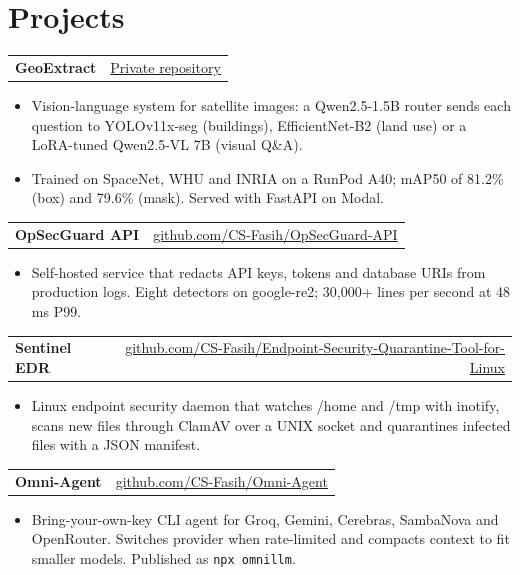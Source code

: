 \documentclass[a4paper,10pt]{article}
\makeatletter
\newcommand{\project}[4]{%
  \begin{tabularx}{\linewidth}{@{}X r@{}}
    \textbf{#1} \;{\color{muted}\small #2} & \small\href{#4}{#3} \\
  \end{tabularx}\vspace{-1pt}}
\makeatother
\begin{document}
\section{Projects}
\project{GeoExtract}{Python, FastAPI, PyTorch, YOLOv11x-seg, EfficientNet-B2, Qwen2.5-VL, React}{Private repository}{https://github.com/GeoExtract}
\begin{itemize}
  \item Vision-language system for satellite images: a Qwen2.5-1.5B router sends each question to YOLOv11x-seg (buildings), EfficientNet-B2 (land use) or a LoRA-tuned Qwen2.5-VL 7B (visual Q\&A).
  \item Trained on SpaceNet, WHU and INRIA on a RunPod A40; mAP50 of 81.2\% (box) and 79.6\% (mask). Served with FastAPI on Modal.
\end{itemize}
\vspace{1pt}

\project{OpSecGuard API}{Python, FastAPI, RE2, WebSocket, Docker}{github.com/CS-Fasih/OpSecGuard-API}{https://github.com/CS-Fasih/OpSecGuard-API}
\begin{itemize}
  \item Self-hosted service that redacts API keys, tokens and database URIs from production logs. Eight detectors on google-re2; 30,000+ lines per second at 48 ms P99.
\end{itemize}
\vspace{1pt}

\project{Sentinel EDR}{C, POSIX, inotify, ClamAV, systemd, Electron}{github.com/CS-Fasih/Endpoint-Security-Quarantine-Tool-for-Linux}{https://github.com/CS-Fasih/Endpoint-Security-Quarantine-Tool-for-Linux}
\begin{itemize}
  \item Linux endpoint security daemon that watches /home and /tmp with inotify, scans new files through ClamAV over a UNIX socket and quarantines infected files with a JSON manifest.
\end{itemize}
\vspace{1pt}

\project{Omni-Agent}{TypeScript, Node.js}{github.com/CS-Fasih/Omni-Agent}{https://github.com/CS-Fasih/Omni-Agent}
\begin{itemize}
  \item Bring-your-own-key CLI agent for Groq, Gemini, Cerebras, SambaNova and OpenRouter. Switches provider when rate-limited and compacts context to fit smaller models. Published as \texttt{npx omnillm}.
\end{itemize}
\vspace{1pt}
\end{document}
